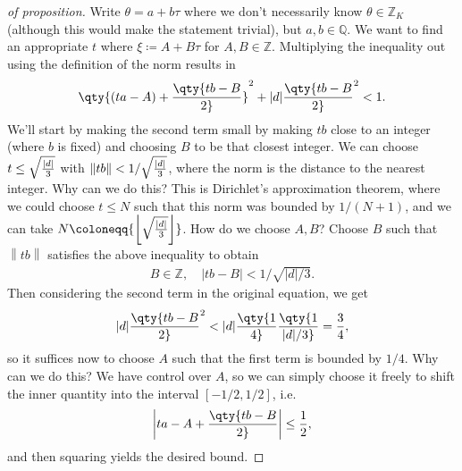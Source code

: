 \begin{proof}[of proposition]

Write \(\theta = a + b \tau\) where we don't necessarily know
\(\theta \in {\mathbb{Z}}_K\) (although this would make the statement
trivial), but \(a, b \in {\mathbb{Q}}\). We want to find an appropriate
\(t\) where \(\xi \coloneqq A+ B \tau\) for \(A, B \in {\mathbb{Z}}\).
Multiplying the inequality out using the definition of the norm results
in
\begin{align*}
\qty{ (ta - A) + \qty{tb - B \over 2} }^2
+ {\left\lvert {d} \right\rvert} \qty{ tb - B \over 2 }^2<1
.\end{align*}
We'll start by making the second term small by making \(tb\) close to an
integer (where \(b\) is fixed) and choosing \(B\) to be that closest
integer. We can choose
\(t \leq \sqrt{{\left\lvert {d} \right\rvert}\over 3 }\) with
\({\left\lVert {tb} \right\rVert} < 1 / \sqrt{{\left\lvert {d} \right\rvert}\over 3 }\),
where the norm is the distance to the nearest integer. Why can we do
this? This is Dirichlet's approximation theorem, where we could choose
\(t\leq N\) such that this norm was bounded by \(1/(N+1)\), and we can
take
\(N \coloneqq{\left\lfloor \sqrt{{\left\lvert {d} \right\rvert}\over 3 } \right\rfloor}\).
How do we choose \(A, B\)? Choose \(B\) such that
\({\left\lVert {tb} \right\rVert}\) satisfies the above inequality to
obtain
\begin{align*}
B\in {\mathbb{Z}},\quad {\left\lvert {tb - B} \right\rvert}< 1 / \sqrt{{\left\lvert {d} \right\rvert}/3 }  
.\end{align*}
Then considering the second term in the original equation, we get
\begin{align*}
{\left\lvert {d} \right\rvert} \qty{ tb -B \over 2 }^2 < {\left\lvert {d} \right\rvert}\qty{1\over 4}\qty{1 \over {\left\lvert {d} \right\rvert}/3} = {3\over 4} 
,\end{align*}
so it suffices now to choose \(A\) such that the first term is bounded
by \(1/4\). Why can we do this? We have control over \(A\), so we can
simply choose it freely to shift the inner quantity into the interval
\([-1/2, 1/2]\), i.e.~
\begin{align*}
{\left\lvert { ta - A + \qty{tb- B \over 2} } \right\rvert} \leq {1\over 2}
,\end{align*}
and then squaring yields the desired bound.

\end{proof}

